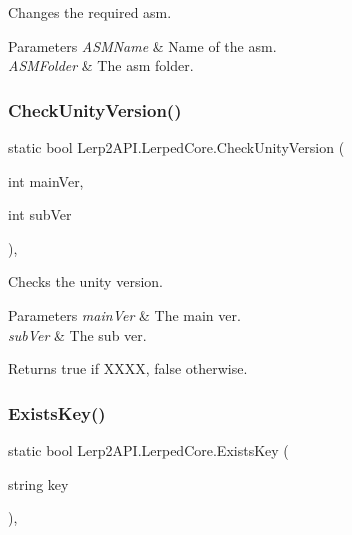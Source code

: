 Changes the required asm. 


\begin{DoxyParams}{Parameters}
{\em A\+S\+M\+Name} & Name of the asm.\\
\hline
{\em A\+S\+M\+Folder} & The asm folder.\\
\hline
\end{DoxyParams}
\mbox{\label{class_lerp2_a_p_i_1_1_lerped_core_ab24f1c6e4a14adc472022a48a21d81d4}} 
\subsubsection{\texorpdfstring{Check\+Unity\+Version()}{CheckUnityVersion()}}
{\footnotesize\ttfamily static bool Lerp2\+A\+P\+I.\+Lerped\+Core.\+Check\+Unity\+Version (\begin{DoxyParamCaption}\item[{int}]{main\+Ver,  }\item[{int}]{sub\+Ver }\end{DoxyParamCaption})\hspace{0.3cm}{\ttfamily [inline]}, {\ttfamily [static]}}



Checks the unity version. 


\begin{DoxyParams}{Parameters}
{\em main\+Ver} & The main ver.\\
\hline
{\em sub\+Ver} & The sub ver.\\
\hline
\end{DoxyParams}
\begin{DoxyReturn}{Returns}
{\ttfamily true} if X\+X\+XX, {\ttfamily false} otherwise.
\end{DoxyReturn}
\mbox{\label{class_lerp2_a_p_i_1_1_lerped_core_afba4bf83e85fef6ec27d94fa535fa2b0}} 
\subsubsection{\texorpdfstring{Exists\+Key()}{ExistsKey()}}
{\footnotesize\ttfamily static bool Lerp2\+A\+P\+I.\+Lerped\+Core.\+Exists\+Key (\begin{DoxyParamCaption}\item[{string}]{key }\end{DoxyParamCaption})\hspace{0.3cm}{\ttfamily [inline]}, {\ttfamily [static]}}



